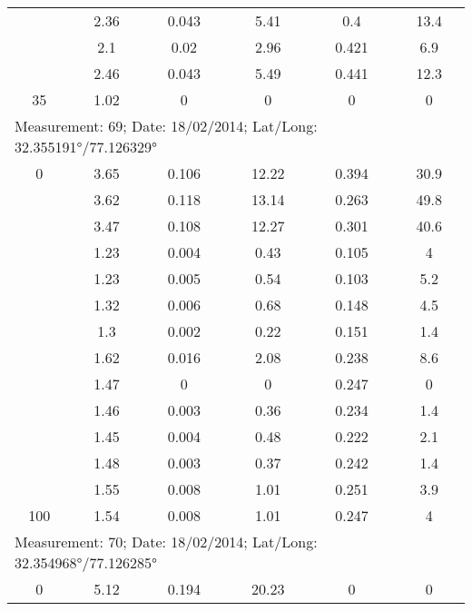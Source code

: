 \begin{longtable}{cccccc}
		& 2.36  & 0.043 & 5.41  & 0.4   & 13.4 \\
		
		& 2.1   & 0.02  & 2.96  & 0.421 & 6.9 \\
		
		& 2.46  & 0.043 & 5.49  & 0.441 & 12.3 \\
		
		35    & 1.02  & 0     & 0     & 0     & 0 \\
		\midrule
		\multicolumn{6}{l}{Measurement: 69; Date: 18/02/2014;
			Lat/Long: 32.355191°/77.126329°} \\		
		\midrule
		0     & 3.65  & 0.106 & 12.22 & 0.394 & 30.9 \\
		
		& 3.62  & 0.118 & 13.14 & 0.263 & 49.8 \\
		
		& 3.47  & 0.108 & 12.27 & 0.301 & 40.6 \\
		
		& 1.23  & 0.004 & 0.43  & 0.105 & 4 \\
		
		& 1.23  & 0.005 & 0.54  & 0.103 & 5.2 \\
		
		& 1.32  & 0.006 & 0.68  & 0.148 & 4.5 \\
		
		& 1.3   & 0.002 & 0.22  & 0.151 & 1.4 \\
		
		& 1.62  & 0.016 & 2.08  & 0.238 & 8.6 \\
		
		& 1.47  & 0     & 0     & 0.247 & 0 \\
		
		& 1.46  & 0.003 & 0.36  & 0.234 & 1.4 \\
		
		& 1.45  & 0.004 & 0.48  & 0.222 & 2.1 \\
		
		& 1.48  & 0.003 & 0.37  & 0.242 & 1.4 \\
		
		& 1.55  & 0.008 & 1.01  & 0.251 & 3.9 \\
		
		100 & 1.54  & 0.008 & 1.01  & 0.247 & 4 \\
		
		\multicolumn{6}{l}{Measurement: 70; Date: 18/02/2014;
			Lat/Long: 32.354968°/77.126285°} \\		
		\midrule
		0 & 5.12  & 0.194 & 20.23 & 0     & 0 \\
		

\end{longtable}
